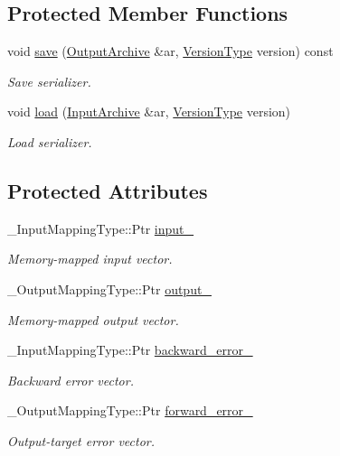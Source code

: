 \subsection*{Protected Member Functions}
\begin{DoxyCompactItemize}
\item 
void \hyperlink{classffnn_1_1layer_1_1_hidden_a98305185267a0f7953f1b53c4bce4cf6}{save} (\hyperlink{classffnn_1_1traits_1_1_serializable_a08d986df75d363fa79506d4f6045cb9f}{Output\-Archive} \&ar, \hyperlink{classffnn_1_1traits_1_1_serializable_a08924b3b7d20cb3cb6eafe517d4f7b30}{Version\-Type} version) const 
\begin{DoxyCompactList}\small\item\em Save serializer. \end{DoxyCompactList}\item 
void \hyperlink{classffnn_1_1layer_1_1_hidden_a696f61b2d9b661b7a8d6bdb3dc32b536}{load} (\hyperlink{classffnn_1_1traits_1_1_serializable_a6e626759259f8f370dd4303b4441a234}{Input\-Archive} \&ar, \hyperlink{classffnn_1_1traits_1_1_serializable_a08924b3b7d20cb3cb6eafe517d4f7b30}{Version\-Type} version)
\begin{DoxyCompactList}\small\item\em Load serializer. \end{DoxyCompactList}\end{DoxyCompactItemize}
\subsection*{Protected Attributes}
\begin{DoxyCompactItemize}
\item 
\-\_\-\-Input\-Mapping\-Type\-::\-Ptr \hyperlink{classffnn_1_1layer_1_1_hidden_a2583fadf189c4a9217ffe0146e8f2d1e}{input\-\_\-}
\begin{DoxyCompactList}\small\item\em Memory-\/mapped input vector. \end{DoxyCompactList}\item 
\-\_\-\-Output\-Mapping\-Type\-::\-Ptr \hyperlink{classffnn_1_1layer_1_1_hidden_a6dcd89d479af9b2a9359b1f723dae995}{output\-\_\-}
\begin{DoxyCompactList}\small\item\em Memory-\/mapped output vector. \end{DoxyCompactList}\item 
\-\_\-\-Input\-Mapping\-Type\-::\-Ptr \hyperlink{classffnn_1_1layer_1_1_hidden_aa9ed4266924e9b9da7faf9d53380a3e5}{backward\-\_\-error\-\_\-}
\begin{DoxyCompactList}\small\item\em Backward error vector. \end{DoxyCompactList}\item 
\-\_\-\-Output\-Mapping\-Type\-::\-Ptr \hyperlink{classffnn_1_1layer_1_1_hidden_a9ca7423a16607df0a278002c249e9d1b}{forward\-\_\-error\-\_\-}
\begin{DoxyCompactList}\small\item\em Output-\/target error vector. \end{DoxyCompactList}\end{DoxyCompactItemize}


